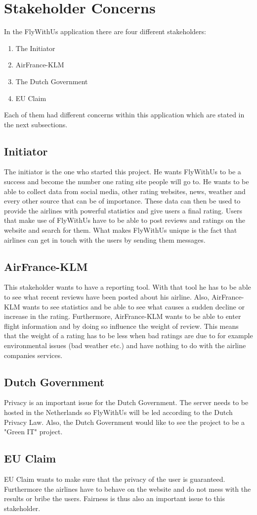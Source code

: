 \section{Stakeholder Concerns}
\label{sec:stakeholders}

In the FlyWithUs application there are four different stakeholders:
\begin{enumerate}
\item The Initiator
\item AirFrance-KLM
\item The Dutch Government
\item EU Claim
\end{enumerate}

Each of them had different concerns within this application which are stated in the next subsections.

\subsection{Initiator}
The initiator is the one who started this project. He wants FlyWithUs to be a success and become the number one rating site people will go to. He wants to be able to collect data from social media, other rating websites, news, weather and every other source that can be of importance. These data can then be used to provide the airlines with powerful statistics and give users a final rating. Users that make use of FlyWithUs have to be able to post reviews and ratings on the website and search for them. What makes FlyWithUs unique is the fact that airlines can get in touch with the users by sending them messages.

\subsection{AirFrance-KLM}
This stakeholder wants to have a reporting tool. With that tool he has to be able to see what recent reviews have been posted about his airline. Also, AirFrance-KLM wants to see statistics and be able to see what causes a sudden decline or increase in the rating. Furthermore, AirFrance-KLM wants to be able to enter flight information and by doing so influence the weight of review. This means that the weight of a rating has to be less when bad ratings are due to for example environmental issues (bad weather etc.) and have nothing to do with the airline companies services.

\subsection{Dutch Government}
Privacy is an important issue for the Dutch Government. The server needs to be hosted in the Netherlands so FlyWithUs will be led according to the Dutch Privacy Law. Also, the Dutch Government would like to see the project to be a "Green IT" project. 

\subsection{EU Claim}
EU Claim wants to make sure that the privacy of the user is guaranteed. Furthermore the airlines have to behave on the website and do not mess with the results or bribe the users. Fairness is thus also an important issue to this stakeholder.
